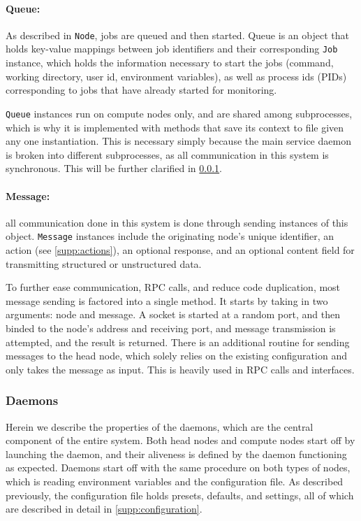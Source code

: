 \documentclass[sigconf]{acmart}
\begin{document}
\paragraph{Queue:} As described in \verb|Node|, jobs are queued and then started. 
Queue is an object that holds key-value mappings between job identifiers and their corresponding \verb|Job| instance, which
holds the information necessary to start the jobs (command, working directory, user id, environment variables), as well as
process ids (PIDs) corresponding to jobs that have already started for monitoring.

\verb|Queue| instances run on compute nodes only, and are shared among subprocesses, which is why it is implemented with methods
that save its context to file given any one instantiation. This is necessary simply because the main service daemon is broken
into different subprocesses, as all communication in this system is synchronous. This will be further clarified in
\cref{sec:daemons}.

\paragraph{Message:} all communication done in this system is done through sending instances of this object.
\verb|Message| instances include the originating node's unique identifier, an action (see \cref{supp:actions}), an optional
response, and an optional content field for transmitting structured or unstructured data.

To further ease communication, RPC calls, and reduce code duplication, most message sending is factored into a single method.
It starts by taking in two arguments: node and message. A socket is started at a random port, and then binded to the 
node's address and receiving port, and message transmission is attempted, and the result is returned. 
There is an additional routine for sending messages to the head node,
which solely relies on the existing configuration and only takes the message as input.
This is heavily used in RPC calls and interfaces.


\subsubsection{Daemons}
\label{sec:daemons}
Herein we describe the properties of the daemons, which are the central component of the entire system.
Both head nodes and compute nodes start off by launching the daemon, and their aliveness is defined by the daemon functioning as
expected.
Daemons start off with the same procedure on both types of nodes, which is reading environment variables and the configuration
file. As described previously, the configuration file holds presets, defaults, and settings, all of which are described in
detail in \cref{supp:configuration}.
\end{document}
